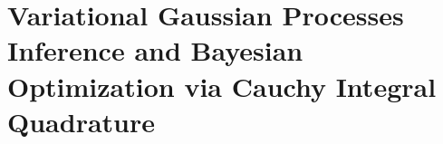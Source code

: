 \chapter{Variational Gaussian Processes Inference and Bayesian Optimization via Cauchy Integral Quadrature}
\label{chapter:ciq}






